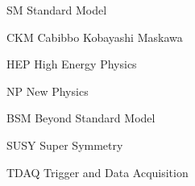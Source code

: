 \begin{abbreviations}
    \item[SM] Standard Model
    \item[CKM] Cabibbo Kobayashi Maskawa
    \item[HEP] High Energy Physics
    \item[NP] New Physics
    \item[BSM] Beyond Standard Model
    \item[SUSY] Super Symmetry
    \item[TDAQ] Trigger and Data Acquisition
\end{abbreviations}

